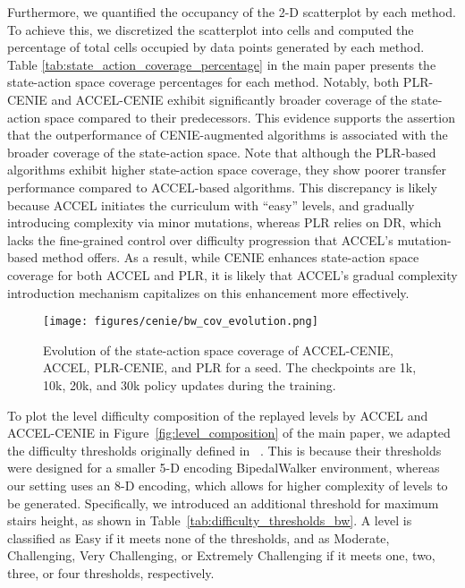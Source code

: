 Furthermore, we quantified the occupancy of the 2-D scatterplot by each method. To achieve this, we discretized the scatterplot into cells and computed the percentage of total cells occupied by data points generated by each method. Table \ref{tab:state_action_coverage_percentage} in the main paper presents the state-action space coverage percentages for each method. Notably, both PLR-CENIE and ACCEL-CENIE exhibit significantly broader coverage of the state-action space compared to their predecessors. This evidence supports the assertion that the outperformance of CENIE-augmented algorithms is associated with the broader coverage of the state-action space. Note that although the PLR-based algorithms exhibit higher state-action space coverage, they show poorer transfer performance compared to ACCEL-based algorithms. This discrepancy is likely because ACCEL initiates the curriculum with ``easy'' levels, and gradually introducing complexity via minor mutations, whereas PLR relies on DR, which lacks the fine-grained control over difficulty progression that ACCEL's mutation-based method offers. As a result, while CENIE enhances state-action space coverage for both ACCEL and PLR, it is likely that ACCEL's gradual complexity introduction mechanism capitalizes on this enhancement more effectively.

\begin{figure}[h]
  \centering
  \texttt{[image: figures/cenie/bw\_cov\_evolution.png]}
  \caption{Evolution of the state-action space coverage of ACCEL-CENIE, ACCEL, PLR-CENIE, and PLR for a seed. The checkpoints are 1k, 10k, 20k, and 30k policy updates during the training.}
  \label{fig:cov_accel_evolution}
\end{figure}

To plot the level difficulty composition of the replayed levels by ACCEL and ACCEL-CENIE in Figure~\ref{fig:level_composition} of the main paper, we adapted the difficulty thresholds originally defined in ~\citet{wang2019poet}. This is because their thresholds were designed for a smaller 5-D encoding BipedalWalker environment, whereas our setting uses an 8-D encoding, which allows for higher complexity of levels to be generated. Specifically, we introduced an additional threshold for maximum stairs height, as shown in Table~\ref{tab:difficulty_thresholds_bw}. A level is classified as Easy if it meets none of the thresholds, and as Moderate, Challenging, Very Challenging, or Extremely Challenging if it meets one, two, three, or four thresholds, respectively.

